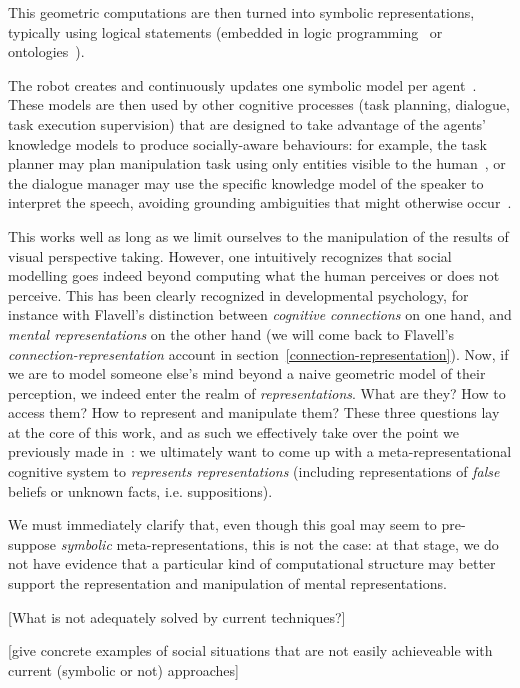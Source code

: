 \documentclass[a4paper]{article}
\newcommand{\ie}{i.e.\xspace}
\begin{document}
This geometric computations are then turned into symbolic representations,
typically using logical statements (embedded in logic
programming~\cite{tenorth2009knowrob} or ontologies~\cite{lemaignan2010oro}).

The robot creates and continuously updates one symbolic model per
agent~\cite{lemaignan2010oro}. These models are then used by other cognitive
processes (task planning, dialogue, task execution supervision) that are
designed to take advantage of the agents' knowledge models to produce
socially-aware behaviours: for example, the task planner may plan manipulation
task using only entities visible to the human~\cite{lallement2014hatp}, or the
dialogue manager may use the specific knowledge model of the speaker to
interpret the speech, avoiding grounding ambiguities that might otherwise
occur~\cite{lemaignan2011grounding}.

This works well as long as we limit ourselves to the manipulation of the results
of visual perspective taking. However, one intuitively recognizes that social
modelling goes indeed beyond computing what the human perceives or does not
perceive. This has been clearly recognized in developmental psychology, for
instance with Flavell's distinction between \emph{cognitive connections} on one
hand, and \emph{mental representations} on the other hand (we will come back to
Flavell's \emph{connection-representation} account in
section~\ref{connection-representation}). Now, if we are to model someone else's
mind beyond a naive geometric model of their perception, we indeed enter the
realm of \emph{representations}. What are they? How to access them? How to
represent and manipulate them? These three questions lay at the core of this
work, and as such we effectively take over the point we previously made
in~\cite{lemaignan2015mutual}:  we ultimately want to come up with a
meta-representational cognitive system to \emph{represents
representations} (including representations of \emph{false} beliefs or unknown
facts, \ie suppositions).

We must immediately clarify that, even though this goal may seem to pre-suppose
\emph{symbolic} meta-representations, this is not the case: at that stage, we do
not have evidence that a particular kind of computational structure may better
support the representation and manipulation of mental representations.

[What is not adequately solved by current techniques?]

[give concrete examples of social situations that are not easily achieveable
with current (symbolic or not) approaches]
\end{document}
